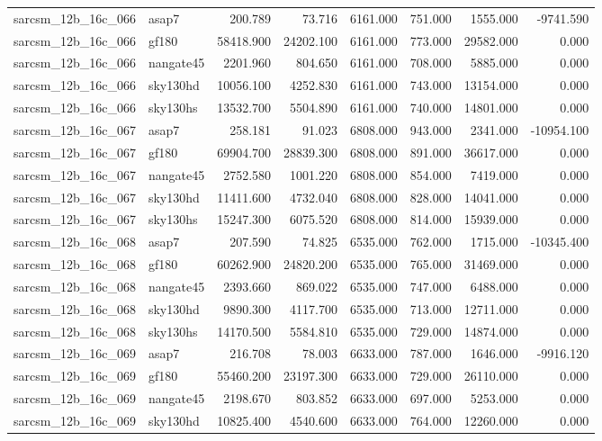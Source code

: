 \begin{tabular}{llrrrrrr}
sarcsm\_12b\_16c\_066 & asap7 & 200.789 & 73.716 & 6161.000 & 751.000 & 1555.000 & -9741.590 \\
sarcsm\_12b\_16c\_066 & gf180 & 58418.900 & 24202.100 & 6161.000 & 773.000 & 29582.000 & 0.000 \\
sarcsm\_12b\_16c\_066 & nangate45 & 2201.960 & 804.650 & 6161.000 & 708.000 & 5885.000 & 0.000 \\
sarcsm\_12b\_16c\_066 & sky130hd & 10056.100 & 4252.830 & 6161.000 & 743.000 & 13154.000 & 0.000 \\
sarcsm\_12b\_16c\_066 & sky130hs & 13532.700 & 5504.890 & 6161.000 & 740.000 & 14801.000 & 0.000 \\
sarcsm\_12b\_16c\_067 & asap7 & 258.181 & 91.023 & 6808.000 & 943.000 & 2341.000 & -10954.100 \\
sarcsm\_12b\_16c\_067 & gf180 & 69904.700 & 28839.300 & 6808.000 & 891.000 & 36617.000 & 0.000 \\
sarcsm\_12b\_16c\_067 & nangate45 & 2752.580 & 1001.220 & 6808.000 & 854.000 & 7419.000 & 0.000 \\
sarcsm\_12b\_16c\_067 & sky130hd & 11411.600 & 4732.040 & 6808.000 & 828.000 & 14041.000 & 0.000 \\
sarcsm\_12b\_16c\_067 & sky130hs & 15247.300 & 6075.520 & 6808.000 & 814.000 & 15939.000 & 0.000 \\
sarcsm\_12b\_16c\_068 & asap7 & 207.590 & 74.825 & 6535.000 & 762.000 & 1715.000 & -10345.400 \\
sarcsm\_12b\_16c\_068 & gf180 & 60262.900 & 24820.200 & 6535.000 & 765.000 & 31469.000 & 0.000 \\
sarcsm\_12b\_16c\_068 & nangate45 & 2393.660 & 869.022 & 6535.000 & 747.000 & 6488.000 & 0.000 \\
sarcsm\_12b\_16c\_068 & sky130hd & 9890.300 & 4117.700 & 6535.000 & 713.000 & 12711.000 & 0.000 \\
sarcsm\_12b\_16c\_068 & sky130hs & 14170.500 & 5584.810 & 6535.000 & 729.000 & 14874.000 & 0.000 \\
sarcsm\_12b\_16c\_069 & asap7 & 216.708 & 78.003 & 6633.000 & 787.000 & 1646.000 & -9916.120 \\
sarcsm\_12b\_16c\_069 & gf180 & 55460.200 & 23197.300 & 6633.000 & 729.000 & 26110.000 & 0.000 \\
sarcsm\_12b\_16c\_069 & nangate45 & 2198.670 & 803.852 & 6633.000 & 697.000 & 5253.000 & 0.000 \\
sarcsm\_12b\_16c\_069 & sky130hd & 10825.400 & 4540.600 & 6633.000 & 764.000 & 12260.000 & 0.000 \\

\end{tabular}
